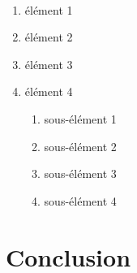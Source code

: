 \paragraph{}
\begin{enumerate}
    \item élément 1
    \item élément 2
    \item élément 3
    \item élément 4
     \begin{enumerate}
        \item sous-élément 1
        \item sous-élément 2
        \item sous-élément 3
        \item sous-élément 4
    \end{enumerate}
\end{enumerate}

\section*{Conclusion}
\paragraph{}
\lipsum[1]
